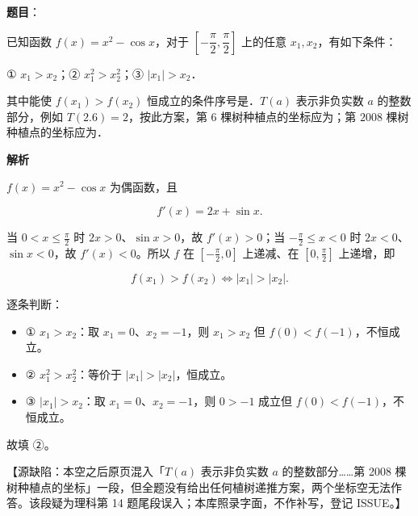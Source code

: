 \begin{answer}

\textbf{题目}：

已知函数 $f(x)=x^2-\cos x$，对于 $\left[-\dfrac{\pi}{2},\dfrac{\pi}{2}\right]$ 上的任意 $x_1,x_2$，有如下条件：

① $x_1>x_2$；② $x_1^2>x_2^2$；③ $|x_1|>x_2$．

其中能使 $f(x_1)>f(x_2)$ 恒成立的条件序号是\gkblank{}．$T(a)$ 表示非负实数 $a$ 的整数部分，例如 $T(2.6)=2$，按此方案，第 $6$ 棵树种植点的坐标应为\gkblank{}；第 $2008$ 棵树种植点的坐标应为\gkblank{}．

\textbf{解析}

$f(x)=x^2-\cos x$ 为偶函数，且

\nopagebreak[4]
\[f'(x)=2x+\sin x .\]

当 $0<x\leqslant\frac\pi2$ 时 $2x>0$、$\sin x>0$，故 $f'(x)>0$；当 $-\frac\pi2\leqslant x<0$ 时 $2x<0$、$\sin x<0$，故 $f'(x)<0$。所以 $f$ 在 $\left[-\frac\pi2,0\right]$ 上递减、在 $\left[0,\frac\pi2\right]$ 上递增，即

\nopagebreak[4]
\[f(x_1)>f(x_2)\iff|x_1|>|x_2| .\]

逐条判断：

\begin{itemize}
\item ① $x_1>x_2$：取 $x_1=0$、$x_2=-1$，则 $x_1>x_2$ 但 $f(0)<f(-1)$，不恒成立。
\item ② $x_1^2>x_2^2$：等价于 $|x_1|>|x_2|$，恒成立。
\item ③ $|x_1|>x_2$：取 $x_1=0$、$x_2=-1$，则 $0>-1$ 成立但 $f(0)<f(-1)$，不恒成立。
\end{itemize}

故填 ②。

【源缺陷：本空之后原页混入「$T(a)$ 表示非负实数 $a$ 的整数部分……第 2008 棵树种植点的坐标」一段，但全题没有给出任何植树递推方案，两个坐标空无法作答。该段疑为理科第 14 题尾段误入；本库照录字面，不作补写，登记 ISSUE。】


\end{answer}
